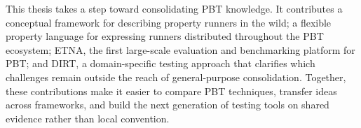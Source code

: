 This thesis takes a step toward consolidating PBT knowledge. It contributes a
conceptual framework for describing property runners in the wild; a flexible property
language for expressing runners distributed throughout the PBT ecosystem; ETNA, the
first large-scale evaluation and benchmarking platform for PBT; and DIRT, a
domain-specific testing approach that clarifies which challenges remain outside the
reach of general-purpose consolidation. Together, these contributions make it easier to
compare PBT techniques, transfer ideas across frameworks, and build the next generation
of testing tools on shared evidence rather than local convention.
